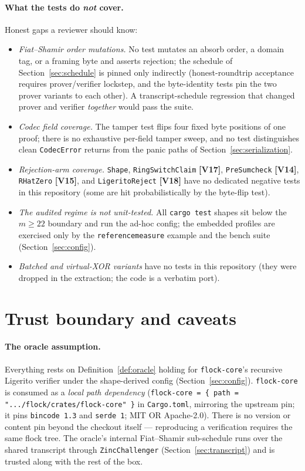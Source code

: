 \documentclass[11pt]{article}
\newcommand{\code}[1]{{\def\_{\textunderscore\allowbreak}\texttt{#1}}}
\newcommand{\Vc}[1]{\textbf{[V#1]}}    %
\begin{document}
\paragraph{What the tests do \emph{not} cover.}  Honest gaps a reviewer
should know:
\begin{itemize}[itemsep=2pt]
\item \emph{Fiat--Shamir order mutations.}  No test mutates an absorb
  order, a domain tag, or a framing byte and asserts rejection; the
  schedule of Section~\ref{sec:schedule} is pinned only indirectly
  (honest-roundtrip acceptance requires prover/verifier lockstep, and the
  byte-identity tests pin the two prover variants to each other).  A
  transcript-schedule regression that changed prover and verifier
  \emph{together} would pass the suite.
\item \emph{Codec field coverage.}  The tamper test flips four fixed byte
  positions of one proof; there is no exhaustive per-field tamper sweep,
  and no test distinguishes clean \code{CodecError} returns from the
  panic paths of Section~\ref{sec:serialization}.
\item \emph{Rejection-arm coverage.}  \code{Shape},
  \code{RingSwitchClaim} \Vc{17}, \code{PreSumcheck} \Vc{14},
  \code{RHatZero} \Vc{15}, and \code{LigeritoReject} \Vc{18} have no
  dedicated negative tests in this repository (some are hit
  probabilistically by the byte-flip test).
\item \emph{The audited regime is not unit-tested.}  All
  \code{cargo test} shapes sit below the $m \ge 22$ boundary and run the
  ad-hoc config; the embedded profiles are exercised only by the
  \code{reference\_measure} example and the bench suite
  (Section~\ref{sec:config}).
\item \emph{Batched and virtual-XOR variants} have no tests in this
  repository (they were dropped in the extraction; the code is a verbatim
  port).
\end{itemize}

\section{Trust boundary and caveats}
\label{sec:trust}

\paragraph{The oracle assumption.}  Everything rests on
Definition~\ref{def:oracle} holding for
\code{flock-core}'s recursive Ligerito verifier under the shape-derived
config (Section~\ref{sec:config}).  \code{flock-core} is consumed as a
\emph{local path dependency}
(\code{flock-core = \{ path = ".../flock/crates/flock-core" \}} in
\code{Cargo.toml}, mirroring the upstream pin; it pins \code{bincode 1.3}
and \code{serde 1}; MIT OR Apache-2.0).  There is no version or content
pin beyond the checkout itself — reproducing a verification requires the
same flock tree.  The oracle's internal Fiat--Shamir sub-schedule runs
over the shared transcript through \code{ZincChallenger}
(Section~\ref{sec:transcript}) and is trusted along with the rest of the
box.
\end{document}
